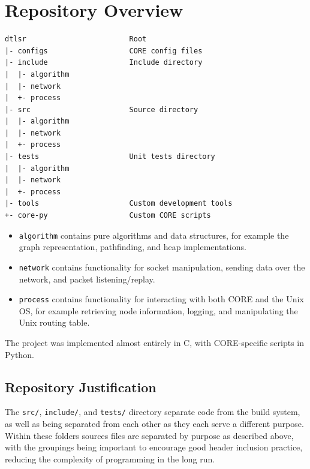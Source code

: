\documentclass[withindex,glossary,openany]{cam-thesis}
\begin{document}
\section{Repository Overview}
\begin{minipage}{1\textwidth} \centering
\begin{lstlisting}[label=repository, frame=tb]
dtlsr                        Root
|- configs                   CORE config files
|- include                   Include directory
|  |- algorithm
|  |- network
|  +- process
|- src                       Source directory
|  |- algorithm
|  |- network
|  +- process
|- tests                     Unit tests directory
|  |- algorithm
|  |- network
|  +- process
|- tools                     Custom development tools
+- core-py                   Custom CORE scripts
\end{lstlisting}
\end{minipage}

\begin{itemize}
	\item
	\texttt{algorithm} contains pure algorithms and data structures, for example the graph representation, pathfinding, and heap implementations.

	\item
	\texttt{network} contains functionality for socket manipulation, sending data over the network, and packet listening/replay.
	
	\item
	\texttt{process} contains functionality for interacting with both CORE and the Unix OS, for example retrieving node information, logging, and manipulating the Unix routing table.
\end{itemize}

The project was implemented almost entirely in C, with CORE-specific scripts in Python.

\subsection{Repository Justification}

The \texttt{src/}, \texttt{include/}, and \texttt{tests/} directory separate code from the build system, as well as being separated from each other as they each serve a different purpose. Within these folders sources files are separated by purpose as described above, with the groupings being important to encourage good header inclusion practice, reducing the complexity of programming in the long run.
\end{document}
